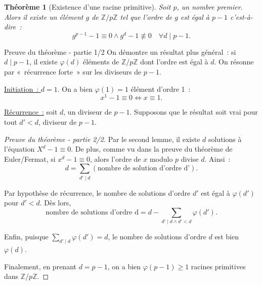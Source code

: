 \documentclass[10pt, mathserif]{beamer}
\newcommand{\Z}{\mathbb Z}
\newtheorem{thm}{Théorème}[section]
\theoremstyle{definition}
\theoremstyle{remark}
\begin{document}
	\begin{frame}
		\begin{thm}[Existence d'une racine primitive]
			Soit $p$, un nombre premier. Alors il existe un élément $g$ de $\Z/p\Z$ tel que l'ordre de $g$ est égal à $p-1$ c'est-à-dire~:
			\[g^{p-1}-1 \equiv 0 \land g^{d}-1 \not \equiv 0 \quad \forall d \mid p-1.\]
		\end{thm}

		\begin{block}{Preuve du théorème - partie 1/2}
			 On démontre un résultat plus général~: si $d \mid p-1$, il existe $\varphi(d)$ éléments de $\Z/p\Z$ dont l'ordre est égal à $d$. On résonne par
			 «~récurrence forte~» sur les diviseurs de $p-1$.
			 
			 \underline{Initiation~: $d = 1$}. On a bien $\varphi(1) = 1$ élément d'ordre 1~:
			 \[x^1 - 1 \equiv 0 \iff x \equiv 1.\]
			 
			 \underline{Récurrence~:} soit $d$, un diviseur de $p-1$. Supposons que le résultat soit vrai pour tout $d' < d$, diviseur de $p-1$.
		\end{block}
	\end{frame}

	\begin{frame}
		\begin{proof}[Preuve du théorème - partie 2/2]
			Par le second lemme, il existe $d$ solutions à l'équation $X^d-1\equiv 0$. De plus, comme vu dans la preuve du théorème de Euler/Fermat,
			si $x^d - 1 \equiv 0$, alors l'ordre de $x$ modulo $p$ divise $d$. Ainsi~:
			\[d = \sum_{d'\mid d}\left(\text{nombre de solution d'ordre d'}\right).\]
			
			Par hypothèse de récurrence, le nombre de solutions d'ordre $d'$ est égal à $\varphi(d')$ pour $d' < d$. Dès lors,
			\[\text{nombre de solutions d'ordre d} = d - \sum_{d' \mid d \land d' < d}\varphi(d').\]

			Enfin, puisque $\sum_{d'\mid d}\varphi(d') = d$, le nombre de solutions d'ordre $d$ est bien $\varphi(d)$.
			
			Finalement, en prenant $d = p-1$, on a bien $\varphi(p-1) \ge 1$ racines primitives dans $\Z/p\Z$.
		\end{proof}
	\end{frame}
\end{document}

